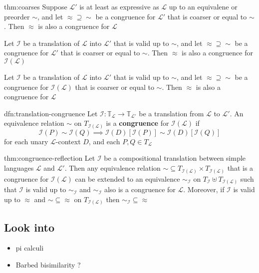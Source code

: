 \documentclass{article}
\begin{document}
\begin{thm}{thm:coarses}{}
    Suppose $\mathcal{L}'$ is at least as expressive as $\mathcal{L}$ up to an equivalene or preorder $\sim$, and let $\approx \supseteq \sim$ be a congruence for $\mathcal{L}'$ that is coarser or equal to $\sim$. Then $\approx$ is also a congruence for $\mathcal{L}$
    
    \longrule{0.08ex}

    Let $\mathcal{I}$ be a translation of $\mathcal{L}$ into $\mathcal{L}'$ that is valid up to $\sim$, and let $\approx \supseteq \sim$ be a congruence for $\mathcal{L}'$ that is coarser or equal to $\sim$. Then $\approx$ is also a congruence for $\mathcal{I}(\mathcal{L})$

    \longrule{0.08ex}

    Let $\mathcal{I}$ be a translation of $\mathcal{L}$ into $\mathcal{L}'$ that is valid up to $\sim$, and let $\approx \supseteq \sim$ be a congruence for $\mathcal{I}(\mathcal{L})$ that is coarser or equal to $\sim$. Then $\approx$ is also a congruence for $\mathcal{L}$
\end{thm}

\begin{dfn}{dfn:translation-congruence}{}
    Let $\mathcal{I} : \mathbb{T}_{\mathcal{L}} \to \mathbb{T}_{\mathcal{L}'}$ be a translation from $\mathcal{L}$ to $\mathcal{L}'$. An equivalence relation $\sim$ on $T_{\mathcal{I}(\mathcal{L})}$ is a \textbf{congruence} for $\mathcal{I}(\mathcal{L})$ if
    \[\mathcal{I}(P) \sim \mathcal{I}(Q) \implies \mathcal{I}(D)[\mathcal{I}(P)] \sim \mathcal{I}(D)[\mathcal{I}(Q)]\]
    for each unary $\mathcal{L}$-context $D$, and each $P, Q\in T_{\mathcal{L}}$
\end{dfn}

\begin{thm}{thm:congruence-reflection}{}
    Let $\mathcal{I}$ be a compositional translation between simple languages $\mathcal{L}$ and $\mathcal{L}'$. Then any equivalence relation $\sim \subseteq T_{\mathcal{I}(\mathcal{L})} \times T_{\mathcal{I}(\mathcal{L})}$ that is a congruence for $\mathcal{I}(\mathcal{L})$ can be extended to an equivalence $\sim_{\mathcal{I}}$ on $T_{\mathcal{I}} \uplus T_{\mathcal{I}(\mathcal{L})}$ such that $\mathcal{I}$ is valid up to $\sim_{\mathcal{I}}$ and $\sim_{\mathcal{I}}$ also is a congruence for $\mathcal{L}$. Moreover, if $\mathcal{I}$ is valid up to $\approx$ and $\sim \subseteq \approx$ on $T_{\mathcal{I}(\mathcal{L})}$ then $\sim_{\mathcal{I}} \subseteq \approx$
\end{thm}

\subsection{Look into}
\begin{itemize}
    \item pi calculi
    \item Barbed bisimilarity ?
\end{itemize}
\end{document}
